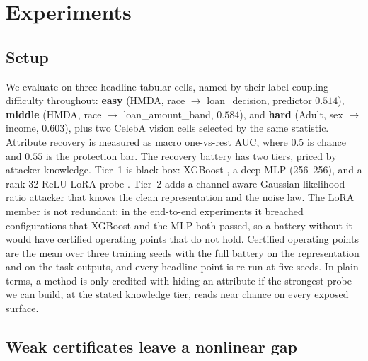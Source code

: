
\section{Experiments}
\label{sec:experiments}

\subsection{Setup}
\label{sec:setup}

We evaluate on three headline tabular cells, named by their label-coupling
difficulty throughout: \textbf{easy} (HMDA, race $\to$ loan\_decision,
predictor $0.514$), \textbf{middle} (HMDA, race $\to$ loan\_amount\_band,
$0.584$), and \textbf{hard} (Adult, sex $\to$ income, $0.603$), plus two
CelebA vision cells selected by the same statistic. Attribute recovery is
measured as macro one-vs-rest AUC, where $0.5$ is chance and $0.55$ is the
protection bar. The recovery battery has two tiers, priced by attacker
knowledge. Tier~1 is black box: XGBoost \citep{chen2016xgboost}, a deep MLP
(256--256), and a rank-32 ReLU LoRA probe \citep{hu2022lora}. Tier~2 adds a
channel-aware Gaussian likelihood-ratio attacker that knows the clean
representation and the noise law. The LoRA member is not redundant: in the
end-to-end experiments it breached configurations that XGBoost and the MLP
both passed, so a battery without it would have certified operating points
that do not hold. Certified operating points are the mean over three
training seeds with the full battery on the representation and on the task
outputs, and every headline point is re-run at five seeds. In plain terms,
a method is only credited with hiding an attribute if the strongest probe
we can build, at the stated knowledge tier, reads near chance on every
exposed surface.

\subsection{Weak certificates leave a nonlinear gap}
\label{sec:demolition}

